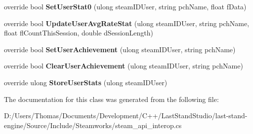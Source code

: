 \begin{DoxyCompactItemize}
\item 
\hypertarget{classValve_1_1Steamworks_1_1CSteamGameServerStats_a2ff9f3e279565f12ce2e4c6447312eef}{}override bool {\bfseries Set\+User\+Stat0} (ulong steam\+I\+D\+User, string pch\+Name, float f\+Data)\label{classValve_1_1Steamworks_1_1CSteamGameServerStats_a2ff9f3e279565f12ce2e4c6447312eef}

\item 
\hypertarget{classValve_1_1Steamworks_1_1CSteamGameServerStats_a7c529ad04876756eaf083b48ccefba78}{}override bool {\bfseries Update\+User\+Avg\+Rate\+Stat} (ulong steam\+I\+D\+User, string pch\+Name, float fl\+Count\+This\+Session, double d\+Session\+Length)\label{classValve_1_1Steamworks_1_1CSteamGameServerStats_a7c529ad04876756eaf083b48ccefba78}

\item 
\hypertarget{classValve_1_1Steamworks_1_1CSteamGameServerStats_a2cb4e77d33c088b36a959bd802ca2dcc}{}override bool {\bfseries Set\+User\+Achievement} (ulong steam\+I\+D\+User, string pch\+Name)\label{classValve_1_1Steamworks_1_1CSteamGameServerStats_a2cb4e77d33c088b36a959bd802ca2dcc}

\item 
\hypertarget{classValve_1_1Steamworks_1_1CSteamGameServerStats_aa1663288da146adc34a38d519b960388}{}override bool {\bfseries Clear\+User\+Achievement} (ulong steam\+I\+D\+User, string pch\+Name)\label{classValve_1_1Steamworks_1_1CSteamGameServerStats_aa1663288da146adc34a38d519b960388}

\item 
\hypertarget{classValve_1_1Steamworks_1_1CSteamGameServerStats_a24593ea5c95d9cbbfc408c6f4b46fc04}{}override ulong {\bfseries Store\+User\+Stats} (ulong steam\+I\+D\+User)\label{classValve_1_1Steamworks_1_1CSteamGameServerStats_a24593ea5c95d9cbbfc408c6f4b46fc04}

\end{DoxyCompactItemize}


The documentation for this class was generated from the following file\+:\begin{DoxyCompactItemize}
\item 
D\+:/\+Users/\+Thomas/\+Documents/\+Development/\+C++/\+Last\+Stand\+Studio/last-\/stand-\/engine/\+Source/\+Include/\+Steamworks/steam\+\_\+api\+\_\+interop.\+cs\end{DoxyCompactItemize}
